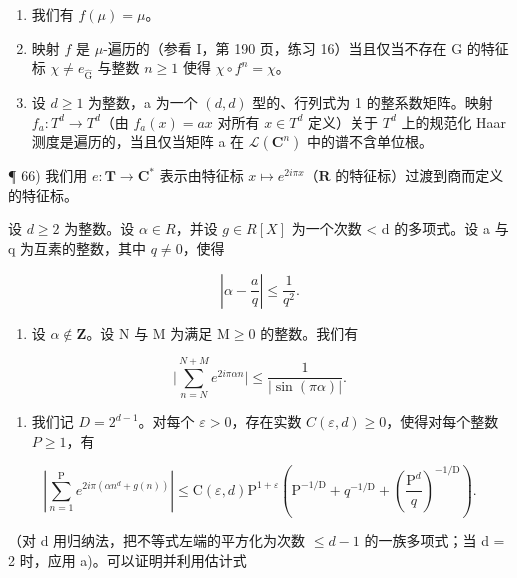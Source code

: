 \begin{enumerate}
\def\labelenumi{\alph{enumi})}
\item
  我们有 \(f(\mu) = \mu\)。
\item
  映射 \(f\) 是 \(\mu\)-遍历的（参看 I，第 190 页，练习 16）当且仅当不存在 G 的特征标 \(\chi \neq e_{\widehat{\mathrm{G}}}\) 与整数 \(n \geqslant 1\) 使得 \(\chi \circ f^n = \chi\)。
\item
  设 \(d \geqslant 1\) 为整数，a 为一个 \((d, d)\) 型的、行列式为 1 的整系数矩阵。映射 \(f_{a} \colon T^{d} \to T^{d}\)（由 \(f_{a}(x) = ax\) 对所有 \(x \in T^{d}\) 定义）关于 \(T^{d}\) 上的规范化 Haar 测度是遍历的，当且仅当矩阵 a 在 \(\mathcal{L}(\mathbf{C}^{n})\) 中的谱不含单位根。
\end{enumerate}

¶ 66) 我们用 \(e\colon \mathbf{T}\to \mathbf{C}^{*}\) 表示由特征标 \(x\mapsto e^{2i\pi x}\)（\(\mathbf{R}\) 的特征标）过渡到商而定义的特征标。

设 \(d \geqslant 2\) 为整数。设 \(\alpha \in R\)，并设 \(g \in R[X]\) 为一个次数 \textless{} d 的多项式。设 a 与 q 为互素的整数，其中 \(q \neq 0\)，使得

\[
\left| \alpha - \frac {a}{q} \right| \leqslant \frac {1}{q ^ {2}}.
\]

\begin{enumerate}
\def\labelenumi{\alph{enumi})}
\tightlist
\item
  设 \(\alpha \notin \mathbf{Z}\)。设 N 与 M 为满足 \(\mathrm{M} \geqslant 0\) 的整数。我们有
\end{enumerate}

\[
\Big | \sum_ {n = N} ^ {N + M} e ^ {2 i \pi \alpha n} \Big | \leqslant \frac {1}{| \sin (\pi \alpha) |}.
\]

\begin{enumerate}
\def\labelenumi{\alph{enumi})}
\setcounter{enumi}{1}
\tightlist
\item
  我们记 \(D = 2^{d-1}\)。对每个 \(\varepsilon > 0\)，存在实数 \(C(\varepsilon, d) \geqslant 0\)，使得对每个整数 \(P \geqslant 1\)，有
\end{enumerate}

\[
\left| \sum_ {n = 1} ^ {\mathrm{P}} e ^ {2 i \pi (\alpha n ^ {d} + g (n))} \right| \leqslant \mathrm{C} (\varepsilon , d) \mathrm{P} ^ {1 + \varepsilon} \left(\mathrm{P} ^ {- 1 / \mathrm{D}} + q ^ {- 1 / \mathrm{D}} + \left(\frac {\mathrm{P} ^ {d}}{q}\right) ^ {- 1 / \mathrm{D}}\right).
\]

（对 d 用归纳法，把不等式左端的平方化为次数 \(\leqslant d - 1\) 的一族多项式；当 d = 2 时，应用 a)。可以证明并利用估计式

